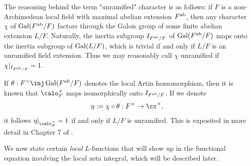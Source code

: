 \documentclass[11pt, x11names, openany]{book}
\begin{document}
\begin{remark}[Terminology]
The reasoning behind the term "unramified" character is as follows: if $F$ is a non-Archimedean local field with maximal abelian extension $F^{\operatorname{ab}}$, then any character $\chi$ of $\operatorname{Gal}(F^{\operatorname{ab}}/F)$ factors through the Galois group of some finite abelian extension $L/F$. Naturally, the inertia subgroup $I_{F^{\operatorname{ab}}/F}$ of $\operatorname{Gal}(F^{\operatorname{ab}}/F)$ maps onto the inertia subgroup of $\operatorname{Gal}(L/F)$, which is trivial if and only if $L/F$ is an unramified field extension. Thus we may reasonably call $\chi$ unramified if $\chi \vert_{I_{F^{\operatorname{ab}}/F}} = 1$.

If $\theta: F^\times \inj \gal(F^{\ab}/F)$ denotes the local Artin homomorphism, then it is known that $\calo_F^\times$ maps isomorphically onto $I_{F^{\operatorname{ab}}/F}$. If we denote
\begin{equation*}
    \eta := \chi \circ \theta: F^\times \to \cc^\times,
\end{equation*}
it follows $\eta \vert_{\calo_F^\times} = 1$ if and only if $L/F$ is unramified. This is exposited in more detail in Chapter 7 of \cite{ChildressCFT}.
\end{remark}


We now state certain \textit{local} $L$-functions that will show up in the functional equation involving the local zeta integral, which will be described later.
\end{document}
